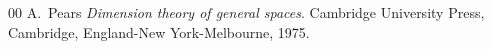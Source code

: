 \documentclass{elsart3-1}
\begin{document}
\begin{thebibliography}{00}
 A.~Pears  {\em Dimension theory of general spaces}. Cambridge University Press, Cambridge, England-New York-Melbourne, 1975.







\end{thebibliography}
\end{document}
